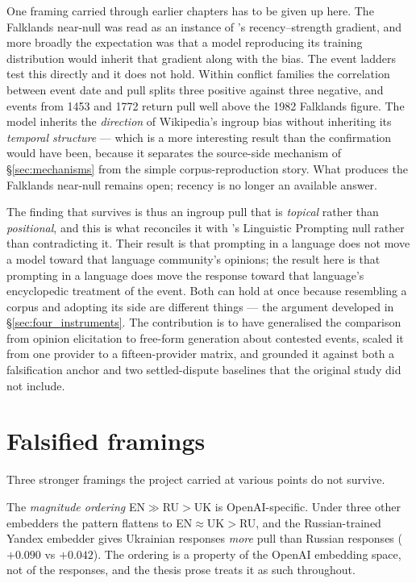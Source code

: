 One framing carried through earlier chapters has to be given up
here. The Falklands near-null was read as an instance of
\citet{oeberst2020wikipedia}'s recency--strength gradient, and more
broadly the expectation was that a model reproducing its training
distribution would inherit that gradient along with the bias. The
event ladders test this directly and it does not hold. Within
conflict families the correlation between event date and pull splits
three positive against three negative, and events from 1453 and 1772
return pull well above the 1982 Falklands figure. The model
inherits the \emph{direction} of Wikipedia's ingroup bias without
inheriting its \emph{temporal structure} --- which is a more
interesting result than the confirmation would have been, because it
separates the source-side mechanism of \S\ref{sec:mechanisms} from
the simple corpus-reproduction story. What produces the Falklands
near-null remains open; recency is no longer an available answer.

The finding that survives is thus an ingroup pull that is
\emph{topical} rather than \emph{positional}, and this is what
reconciles it with \citet{durmus2023globalopinionqa}'s Linguistic
Prompting null rather than contradicting it. Their result is that
prompting in a language does not move a model toward that
language community's opinions; the result here is that prompting in
a language does move the response toward that language's
encyclopedic treatment of the event. Both can hold at once because
resembling a corpus and adopting its side are different things ---
the argument developed in \S\ref{sec:four_instruments}. The
contribution is to have generalised the comparison from opinion
elicitation to free-form generation about contested events, scaled it
from one provider to a fifteen-provider matrix, and grounded it
against both a falsification anchor and two settled-dispute
baselines that the original study did not include.

\section{Falsified framings}\label{sec:falsified_framings}

Three stronger framings the project carried at various points do not
survive.

The \emph{magnitude ordering} EN${\gg}$RU${>}$UK is OpenAI-specific.
Under three other embedders the pattern flattens to
EN${\approx}$UK${>}$RU, and the Russian-trained Yandex embedder gives
Ukrainian responses \emph{more} pull than Russian responses
($+0.090$ vs $+0.042$). The ordering is a property
of the OpenAI embedding space, not of the responses, and the thesis
prose treats it as such throughout.

